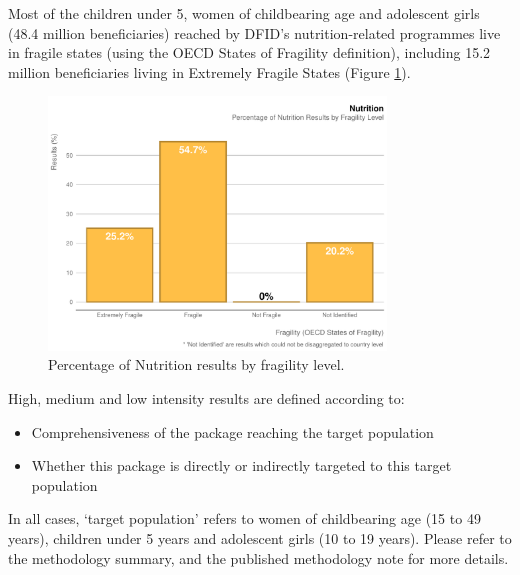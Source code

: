 Most of the children under 5, women of childbearing age and adolescent girls (48.4 million
beneficiaries) reached by DFID's nutrition-related programmes live in fragile states (using the OECD States of Fragility definition), including 15.2 million beneficiaries living in Extremely Fragile States (Figure \ref{fig:nutrition_fragility_plot}). %

\begin{figure}[htbp]
	\centering
\begin{knitrout}
\color{fgcolor}
\includegraphics[width=0.8\textwidth]{figs/nutrition_fragility_plot-1} 

\end{knitrout}
	\caption{Percentage of Nutrition results by fragility level.}\label{fig:nutrition_fragility_plot}
\end{figure}


High, medium and low intensity results are defined according to:
\begin{itemize}
	\item Comprehensiveness of the package reaching the target population
	\item Whether this package is directly or indirectly targeted to this target population
\end{itemize}

In all cases, `target population' refers to women of childbearing age (15 to 49 years), children under 5 years and adolescent girls (10 to 19 years). %
Please refer to the methodology summary, and the published methodology note for more details. %

